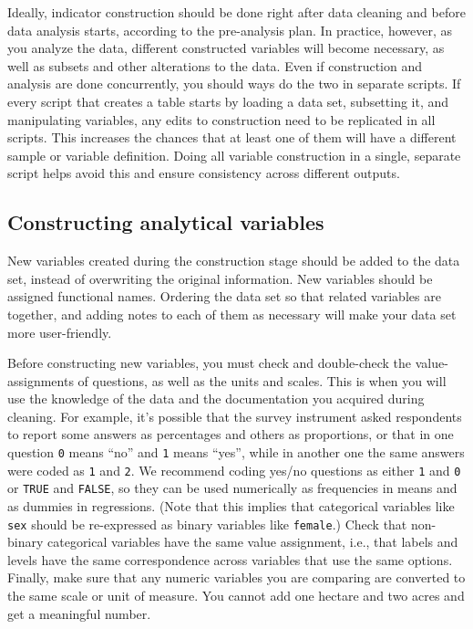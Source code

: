 Ideally, indicator construction should be done right after data cleaning and before data analysis starts,
according to the pre-analysis plan.
In practice, however, as you analyze the data,
different constructed variables will become necessary,
as well as subsets and other alterations to the data.
Even if construction and analysis are done concurrently,
you should ways do the two in separate scripts.
If every script that creates a table starts by loading a data set,
subsetting it, and manipulating variables,
any edits to construction need to be replicated in all scripts.
This increases the chances that at least one of them will have a different sample or variable definition.
Doing all variable construction in a single, separate script helps
avoid this and ensure consistency across different outputs.

\subsection{Constructing analytical variables}
New variables created during the construction stage should be added to the data set, instead of overwriting the original information.
New variables should be assigned functional names.
Ordering the data set so that related variables are together,
and adding notes to each of them as necessary will make your data set more user-friendly.

Before constructing new variables,
you must check and double-check the value-assignments of questions,
as well as the units and scales.
This is when you will use the knowledge of the data and the documentation you acquired during cleaning.
For example, it's possible that the survey instrument asked respondents
to report some answers as percentages and others as proportions,
or that in one question \texttt{0} means ``no'' and \texttt{1} means ``yes'',
while in another one the same answers were coded as \texttt{1} and \texttt{2}.
We recommend coding yes/no questions as either \texttt{1} and \texttt{0} or \texttt{TRUE} and \texttt{FALSE},
so they can be used numerically as frequencies in means and as dummies in regressions.
(Note that this implies that categorical variables like \texttt{sex}
should be re-expressed as binary variables like \texttt{female}.)
Check that non-binary categorical variables have the same value assignment, i.e.,
that labels and levels have the same correspondence across variables that use the same options.
Finally, make sure that any numeric variables you are comparing are converted to the same scale or unit of measure.
You cannot add one hectare and two acres and get a meaningful number.

